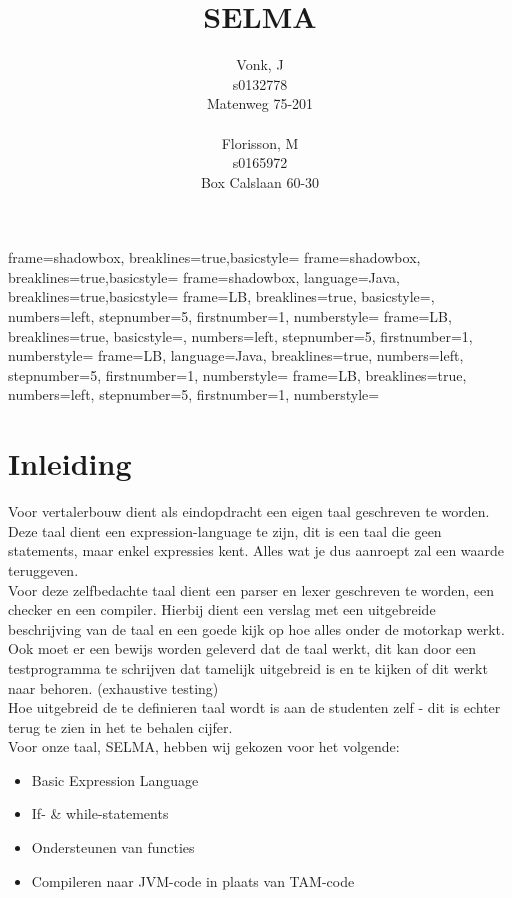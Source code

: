 \documentclass[]{article}
\title{SELMA}
\author{ 
Vonk, J\\
s0132778\\
Matenweg 75-201\\
\\
Florisson, M\\
s0165972\\
Box Calslaan 60-30}
\begin{document}
	{frame=shadowbox, breaklines=true,basicstyle=\footnotesize}
	{frame=shadowbox, breaklines=true,basicstyle=\small}
	{frame=shadowbox, language=Java, breaklines=true,basicstyle=\footnotesize}
	{frame=LB, breaklines=true, basicstyle=\scriptsize, numbers=left, stepnumber=5, firstnumber=1, numberstyle=\tiny}	
	{frame=LB, breaklines=true, basicstyle=\scriptsize, numbers=left, stepnumber=5, firstnumber=1, numberstyle=\tiny}	
	{frame=LB, language=Java, breaklines=true, numbers=left, stepnumber=5, firstnumber=1, numberstyle=\tiny}	
	{frame=LB, breaklines=true, numbers=left, stepnumber=5, firstnumber=1, numberstyle=\tiny}	

\newcommand{\todo}[1]{\marginpar{\fcolorbox{red}{yellow}{\textbf{#1}}}}



\begin{titlepage}
\maketitle 
\end{titlepage}
\setcounter{secnumdepth}{5}
\setcounter{tocdepth}{5}
\tableofcontents{}

\newpage
\section{Inleiding}
Voor vertalerbouw dient als eindopdracht een eigen taal geschreven te worden. Deze taal dient een expression-language te zijn, dit is een taal die geen statements, maar enkel expressies kent. Alles wat je dus aanroept zal een waarde teruggeven.\\
Voor deze zelfbedachte taal dient een parser en lexer geschreven te worden, een checker en een compiler. Hierbij dient een verslag met een uitgebreide beschrijving van de taal en een goede kijk op hoe alles onder de motorkap werkt. Ook moet er een bewijs worden geleverd dat de taal werkt, dit kan door een testprogramma te schrijven dat tamelijk uitgebreid is en te kijken of dit werkt naar behoren. (exhaustive testing) \\
Hoe uitgebreid de te definieren taal wordt is aan de studenten zelf - dit is echter terug te zien in het te behalen cijfer.\\
Voor onze taal, SELMA, hebben wij gekozen voor het volgende:
\todo{Klopt?}
\begin{itemize}
\item Basic Expression Language
\item If- \& while-statements
\item Ondersteunen van functies
\item Compileren naar JVM-code in plaats van TAM-code
\end{itemize}
\end{document}

